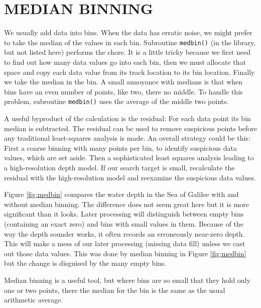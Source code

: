 \section{MEDIAN BINNING}
We usually add data into bins.
When the data has erratic noise,
we might prefer to take the median of the values in each bin.
Subroutine \texttt{medbin()}
(in the library, but not listed here)
performs the chore.
It is a little tricky because we first need to find out
how many data values go into each bin,
then we must allocate that space
and copy each data value from its track location to its
bin location.
Finally we take the median in the bin.
A small annoyance with medians
is that when bins have an even number of points,
like two, there no middle.
To handle this problem,
subroutine \texttt{medbin()}
uses the average of the middle two points.

\par
A useful byproduct of the calculation is the residual:
For each data point its bin median is subtracted.
The residual can be used to remove suspicious points
before any traditional least-squares analysis is made.
An overall strategy could be this:
First a coarse binning with many points per bin,
to identify suspicious data values,
which are set aside.
Then a sophisticated least squares analysis
leading to a high-resolution depth model.
If our search target is small, 
recalculate the residual with the high-resolution model
and reexamine the suspicious data values.

\par
Figure \ref{fig:medbin} compares the water depth in the Sea of Galilee
with and without median binning.
The difference does not seem great here
but it is more significant than it looks.
Later processing will distinguish between empty bins (containing an exact zero)
and bins with small values in them.
Because of the way the depth sounder works,
it often records an erroneously near-zero depth.
This will make a mess of our later processing
(missing data fill)
unless we cast out those data values.
This was done by median binning in Figure \ref{fig:medbin}
but the change is disguised by the many empty bins.

\par
Median binning is a useful tool,
but where bins are so small that they hold only one or two points,
there the median for the bin is the same as the usual arithmetic average.


